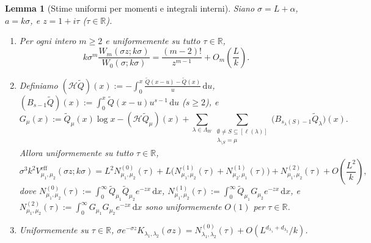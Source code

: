 \documentclass[11pt, reqno]{amsart}
\newtheorem{lemma}{Lemma}[section]
\theoremstyle{remark}
\numberwithin{equation}{section}
\newcommand{\R}{\mathbb{R}}
\newcommand{\cH}{\mathcal{H}}
\newcommand{\dd}{\,\mathrm{d}}
\begin{document}
\begin{lemma}[Stime uniformi per momenti e integrali interni]\label{lem:uniform-W-V}
Siano $\sigma = L + \alpha$, $a = k\sigma$, e $z = 1+i\tau$ ($\tau \in \R$).
\begin{enumerate}
\item[(i)] Per ogni intero $m \ge 2$ e uniformemente su tutto $\tau \in \R$,
\begin{equation}\label{eq:Wm-uniform}
k \sigma^m \frac{W_m(\sigma z; k\sigma)}{W_0(\sigma; k\sigma)} = \frac{(m-2)!}{z^{m-1}} + O_m\!\left(\frac{L}{k}\right).
\end{equation}
\item[(ii)] Definiamo $(\cH\widetilde{Q})(x) := -\int_0^x \frac{\widetilde{Q}(x-u)-\widetilde{Q}(x)}{u}\dd u$,
$(B_{s-1}\widetilde{Q})(x) := \int_0^x \widetilde{Q}(x-u) u^{s-1}\dd u$ ($s \ge 2$), e
\[
G_\mu(x) := \widetilde{Q}_\mu(x)\log x - (\cH\widetilde{Q}_\mu)(x)
+ \sum_{\lambda\in\Lambda_W}\sum_{\substack{\emptyset\neq S\subseteq[\ell(\lambda)] \\ \lambda_{\setminus S}=\mu}}
\bigl(B_{s_\lambda(S)-1}\widetilde{Q}_\lambda\bigr)(x).
\]
Allora uniformemente su tutto $\tau \in \R$,
\begin{equation}\label{eq:V-uniform}
\sigma^3 k^2 V_{\mu_1,\mu_2}^{\mathrm{eff}}(\sigma z; k\sigma)
= L^2 N_{\mu_1,\mu_2}^{(0)}(\tau)
+ L\bigl(N_{\mu_1,\mu_2}^{(1)}(\tau) + N_{\mu_2,\mu_1}^{(1)}(\tau)\bigr)
+ N_{\mu_1,\mu_2}^{(2)}(\tau) + O\!\left(\frac{L^2}{k}\right),
\end{equation}
dove $N_{\mu_1,\mu_2}^{(0)}(\tau) := \int_0^\infty \widetilde{Q}_{\mu_1}\widetilde{Q}_{\mu_2} e^{-zx}\dd x$,
$N_{\mu_1,\mu_2}^{(1)}(\tau) := \int_0^\infty \widetilde{Q}_{\mu_1} G_{\mu_2} e^{-zx}\dd x$, e
$N_{\mu_1,\mu_2}^{(2)}(\tau) := \int_0^\infty G_{\mu_1} G_{\mu_2} e^{-zx}\dd x$ sono uniformemente $O(1)$ per $\tau \in \R$.
\item[(iii)] Uniformemente su $\tau \in \R$, $\sigma e^{-\sigma z} K_{\lambda_1,\lambda_2}(\sigma z)
= N_{\lambda_1,\lambda_2}^{(0)}(\tau) + O(L^{d_{\lambda_1}+d_{\lambda_2}}/k)$.
\end{enumerate}
\end{lemma}
\end{document}
